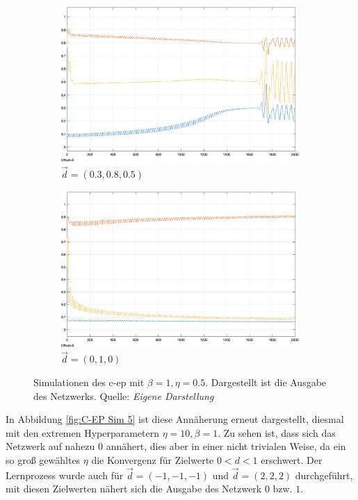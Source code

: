 \begin{figure}[h]
  \centering
  \begin{subfigure}[b]{0.5\textwidth}
    \includegraphics[width=\textwidth]{abbildungen/c_ep_sim_1_ausgabe.png}
    \caption{\(\vec{d}=(0.3,0.8,0.5)\)}
  \end{subfigure}%
  \hfill
  \begin{subfigure}[b]{0.5\textwidth}
    \includegraphics[width=\textwidth]{abbildungen/c_ep_sim_2_ausgabe.png}
    \caption{\(\vec{d}=(0,1,0)\)}
  \end{subfigure}
  \caption{Simulationen des \ac{c-ep} mit \(\beta=1,\eta=0.5\). Dargestellt ist die Ausgabe des Netzwerks. Quelle: \textit{Eigene Darstellung}}
  \label{fig:C-EP Sim 1,2}
\end{figure}

In Abbildung \ref{fig:C-EP Sim 5} ist diese Annäherung erneut dargestellt, diesmal mit den extremen Hyperparametern \(\eta=10,\beta=1\). Zu sehen ist, dass sich das Netzwerk auf nahezu \(0\) annähert, dies aber in einer nicht trivialen Weise, da ein so groß gewähltes \(\eta\) die Konvergenz für Zielwerte \(0<d<1\) erschwert. Der Lernprozess wurde auch für \(\vec{d}=(-1,-1,-1)\) und \(\vec{d}=(2,2,2)\) durchgeführt, mit diesen Zielwerten nähert sich die Ausgabe des Netzwerk \(0\) bzw. \(1\).


